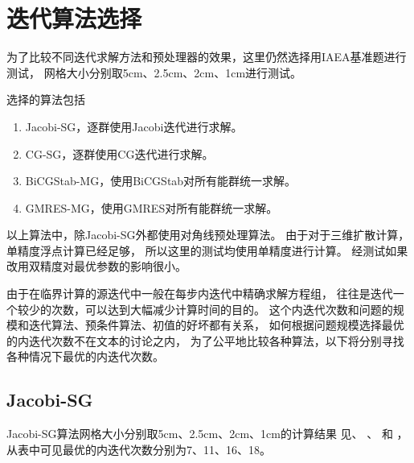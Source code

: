 \section{迭代算法选择}

为了比较不同迭代求解方法和预处理器的效果，这里仍然选择用IAEA基准题进行测试，
网格大小分别取5cm、2.5cm、2cm、1cm进行测试。

选择的算法包括
\begin{enumerate}
\item Jacobi-SG，逐群使用Jacobi迭代进行求解。
\item CG-SG，逐群使用CG迭代进行求解。
\item BiCGStab-MG，使用BiCGStab对所有能群统一求解。
\item GMRES-MG，使用GMRES对所有能群统一求解。
\end{enumerate}
以上算法中，除Jacobi-SG外都使用对角线预处理算法。
由于对于三维扩散计算，单精度浮点计算已经足够，
所以这里的测试均使用单精度进行计算。
经测试如果改用双精度对最优参数的影响很小。

由于在临界计算的源迭代中一般在每步内迭代中精确求解方程组，
往往是迭代一个较少的次数，可以达到大幅减少计算时间的目的。
这个内迭代次数和问题的规模和迭代算法、预条件算法、初值的好坏都有关系，
如何根据问题规模选择最优的内迭代次数不在文本的讨论之内，
为了公平地比较各种算法，以下将分别寻找各种情况下最优的内迭代次数。

\subsection{Jacobi-SG}
\label{sec:equsolve.iter.jacobi-sg}

Jacobi-SG算法网格大小分别取5cm、2.5cm、2cm、1cm的计算结果
见、%
、%
和%
，
从表中可见最优的内迭代次数分别为7、11、16、18。

